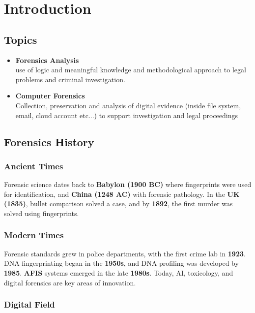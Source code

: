 \chapter{Introduction}

\section{Topics}
\begin{itemize}
  \item \textbf{Forensics Analysis} \\
    use of logic and meaningful knowledge and methodological approach to
    legal problems and criminal investigation.
  \item \textbf{Computer Forensics} \\
    Collection, preservation and analysis of digital evidence
    (inside file system, email, cloud account etc...) to support
    investigation and legal proceedings
\end{itemize}

\section{Forensics History}

\subsection{Ancient Times}
Forensic science dates back to \textbf{Babylon (1900 BC)} where fingerprints
were used for identification, and \textbf{China (1248 AC)} with forensic pathology.
In the \textbf{UK (1835)}, bullet comparison solved a case, and by \textbf{1892},
the first murder was solved using fingerprints.

\subsection{Modern Times}
Forensic standards grew in police departments, with the first crime lab in
\textbf{1923}. DNA fingerprinting began in the \textbf{1950s}, and DNA profiling
was developed by \textbf{1985}. \textbf{AFIS} systems emerged in the late
\textbf{1980s}. Today, AI, toxicology, and digital forensics are key areas
of innovation.

\subsection{Digital Field}

